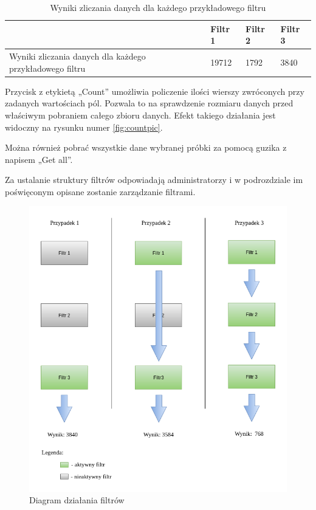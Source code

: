 \documentclass[a4paper,12pt,twoside]{article}
\begin{document}
\begin{center}
\begin{table} [H]
\begin{tabular}{| p{4cm }| p{2.7cm} | p{2.7cm} | p{2.7cm}|}
\hline
& Filtr 1 & Filtr 2 & Filtr 3\\
\hline
Wyniki zliczania danych dla każdego przykładowego filtru & 19712 & 1792 & 3840\\ \hline
\end{tabular}

\caption{Wyniki zliczania danych dla każdego przykładowego filtru}
\label{table:filterDiagramTable}
\end{table}
\end{center}

Przycisk z etykietą „Count” umożliwia policzenie ilości wierszy zwróconych przy zadanych wartościach pól. Pozwala to na sprawdzenie rozmiaru danych przed właściwym pobraniem całego zbioru danych. Efekt takiego działania jest widoczny na rysunku
numer \ref{fig:countpic}.

Można również pobrać wszystkie dane wybranej próbki za pomocą guzika z napisem „Get all”.

Za ustalanie struktury filtrów odpowiadają administratorzy i w podrozdziale im poświęconym
opisane zostanie zarządzanie filtrami.

\setlength{\footskip}{0pt}
\begin{figure}
\includegraphics[width=1\linewidth]{obrazy/aplikacja/filterDiagram.png}
\caption{Diagram działania filtrów}
\label{fig:filterDiagrampic}
\end{figure}
\restoregeometry
\end{document}
